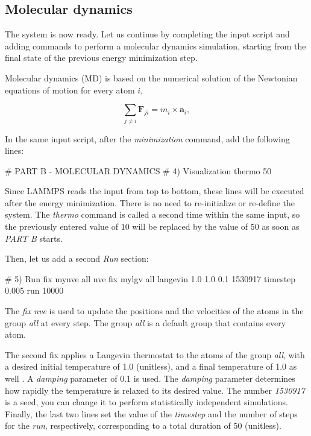 \subsection{Molecular dynamics}
The system is now ready. Let us continue by completing the input script and adding commands to perform a molecular
dynamics simulation, starting from the final state of the previous energy minimization step.

\begin{tcolorbox}[colback=mylightblue!5!white,colframe=mylightblue!75!black,title=Background Information -- What is molecular dynamics?]

\vspace{0.25cm} \noindent Molecular dynamics (MD) is based on the numerical solution of the Newtonian
equations of motion for every atom $i$,

$$\sum_{j \ne i} \boldsymbol{F}_{ji} = m_i \times \boldsymbol{a}_i,$$
\end{tcolorbox}

\noindent In the same input script, after the \textit{minimization} command, add the following
lines:

\begin{lcverbatim}
# PART B - MOLECULAR DYNAMICS
# 4) Visualization
thermo 50
\end{lcverbatim}

\noindent Since LAMMPS reads the input from top to bottom, these lines will be
executed after the energy minimization. There is no need to re-initialize
or re-define the system. The \textit{thermo} command is called a second time within
the same input, so the previously entered value of 10 will be replaced by
the value of 50 as soon as \textit{PART B} starts.

\vspace{0.25cm} \noindent Then, let us add a second \textit{Run} section:

\begin{lcverbatim}
# 5) Run
fix mynve all nve
fix mylgv all langevin 1.0 1.0 0.1 1530917
timestep 0.005
run 10000
\end{lcverbatim}

\noindent The \textit{fix nve} is used to update the positions and the velocities of the
atoms in the group \textit{all} at every step. The group \textit{all} is a default group
that contains every atom.

\vspace{0.25cm} \noindent The second fix applies a Langevin thermostat to the atoms of the group
\textit{all}, with a desired initial temperature of 1.0 (unitless), and a final
temperature of 1.0 as well \cite{schneider1978molecular}.
A \textit{damping} parameter of 0.1 is used. The \textit{damping}
parameter determines how rapidly the temperature is relaxed to its desired value.
The number \textit{1530917} is a seed, you can
change it to perform statistically independent simulations.
Finally, the last two lines set the value of the \textit{timestep} and the
number of steps for the \textit{run}, respectively, corresponding to a total duration
of 50 (unitless).


